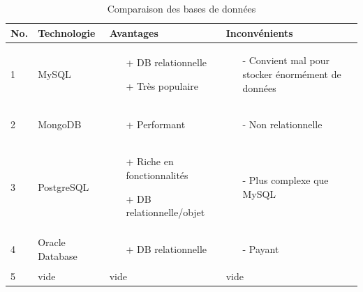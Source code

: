 \documentclass[
    iai, %
    eai, %
]{heig-tb}
\begin{document}
\begin{table}[h]
  \begin{center}
    \caption{Comparaison des bases de données \label{specification}}
    \begin{tabularx}{\textwidth}{|m{1cm} |m{2cm} |m{4cm} |m{4cm}|}
      No. & Technologie     & Avantages                  & Inconvénients \\ \toprule
      1   & MySQL           & \begin{itemize}
        \item[+] DB relationnelle
        \item[+] Très populaire
      \end{itemize}  & 
      \begin{itemize}
        \item[-] Convient mal pour stocker énormément de données
      \end{itemize}                                          \\ \midrule
      2   & MongoDB         & \begin{itemize}
        \item[+] Performant
      \end{itemize} & 
      \begin{itemize}
        \item[-] Non relationnelle
      \end{itemize}                                         \\ \midrule
      3   & PostgreSQL      & \begin{itemize}
        \item[+] Riche en fonctionnalités
        \item[+] DB relationnelle/objet
      \end{itemize} & 
      \begin{itemize}
        \item[-] Plus complexe que MySQL
      \end{itemize}                                         \\ \midrule
      4   & Oracle Database & \begin{itemize}
        \item[+] DB relationnelle
      \end{itemize} & 
      \begin{itemize}
        \item[-] Payant
      \end{itemize}                                         \\ \midrule
      5   & vide            & vide                       & vide          \\ \midrule
    \end{tabularx}
  \end{center}
\end{table}
\end{document}

